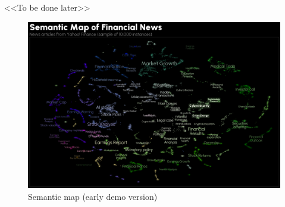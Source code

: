 <<To be done later>>

\begin{figure}[H]
    \centering
    \includegraphics[width=1\linewidth]{img/semantic_map.png}
    \caption{Semantic map (early demo version)}
    \label{fig:semantic_map}
\end{figure}